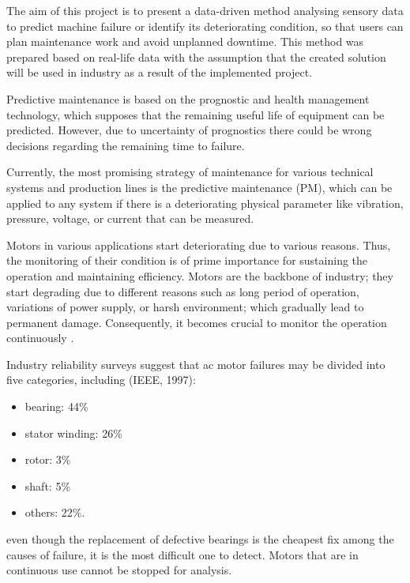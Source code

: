 The aim of this project is to present a data-driven method analysing sensory data to predict machine failure or identify its deteriorating condition, so that users can plan maintenance work and avoid unplanned downtime. This method was prepared based on real-life data with the assumption that the created solution will be used in industry as a result of the implemented project. 

Predictive maintenance is based on the prognostic and health management technology, which supposes that the remaining useful life of equipment can be predicted. However, due to uncertainty of prognostics there could be wrong decisions regarding the remaining time to failure. 

Currently, the most promising strategy of maintenance for various technical systems and production lines is the predictive maintenance (PM), which can be applied to any system if there is a deteriorating physical parameter like vibration, pressure, voltage, or current that can be measured\cite{sampaio_prediction_2019}.

Motors in various applications start deteriorating due to various reasons. Thus, the monitoring of their condition is of prime importance for sustaining the operation and maintaining efficiency. Motors are the backbone of industry; they start degrading due to different reasons such as long period of operation, variations of power supply, or harsh environment; which gradually lead to permanent damage. Consequently, it becomes crucial to monitor the operation continuously \cite{han_motor_2019}. 

Industry reliability surveys suggest that ac motor failures may be divided into five categories, including (IEEE, 1997): 

\begin{itemize}
	\item bearing: 44\% 
	
	\item stator winding: 26\% 
	
	\item rotor: 3\% 
	
	\item shaft: 5\% 
	
	\item others: 22\%. 
\end{itemize}


even though the replacement of defective bearings is the cheapest fix among the causes of failure, it is the most difficult one to detect. Motors that are in continuous use cannot be stopped for analysis. 



